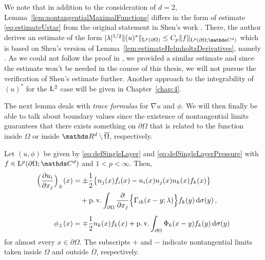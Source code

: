 \begin{rem}
  We note that in addition to the consideration of $d = 2$, Lemma~\ref{lem:nontangentialMaximalFunctions} differs in the form of estimate \eqref{eq:estimateUstar} from the original statement in Shen's work \cite[Lem.\@~3.2]{Shen2012}.
  There, the author derives an estimate of the form $|\lambda|^{1/2}\|(u)^*\|_{\Ell^p(\partial\Omega)} \leq C_p \|f\|_{\Ell^p(\partial\Omega; \C^d)}$ which is based on Shen's version of Lemma~\ref{lem:estimateHelmholtzDerivatives}, namely \cite[Lem.\@~2.1]{Shen2012}.
  As we could not follow the proof in \cite{Shen2012}, we provided a similar estimate and since the estimate won't be needed in the course of this thesis, we will not pursue the verification of Shen's estimate further.
  Another approach to the integrability of $(u)^*$ for the $\mathrm{L}^2$ case will be given in Chapter~\ref{chap:4}.
\end{rem}

The next lemma deals with \emph{trace formulas} for $\nabla u$ and $\phi$. 
We will then finally be able to talk about boundary values since the existence of nontangential limits guarantees that there exists something on $\partial\Omega$ that is related to the function inside $\Omega$ or inside $\R^d \setminus \overline\Omega$, respectively.

\begin{lem}
  \label{lem:traceFormulas}
  Let $(u,\phi)$ be given by \eqref{eq:defSingleLayer} and \eqref{eq:defSingleLayerPressure} with $f \in \Ell^p(\partial\Omega; \C^d)$ and $1 < p < \infty$.
  Then,
  \begin{align}
    \Big( \frac{\partial u_i}{\partial x_j} \Big)_{\pm}(x) 
    &= \pm \frac{1}{2} \big\{ n_j(x) f_i(x) - n_i(x) n_j(x) n_k(x) f_k(x) \big\} \nonumber\\
    &\quad+ \operatorname{p. v.} \int_{\partial\Omega} \frac{\partial}{\partial x_j} \Big\{ \Gamma_{ik} (x - y; \lambda) \Big\} f_k(y) \, {\operatorname{d}\!{\sigma}}(y)\,, \label{eq:traceFormula} \\[0.5em]
    \phi_\pm(x) &= \mp \frac{1}{2} n_k(x) f_k(x) + \operatorname{p. v.}\int_{\partial\Omega} \Phi_k(x - y) f_k(y) \, {\operatorname{d}\!{\sigma}}(y) \nonumber
  \end{align}
  for almost every $x \in \partial\Omega$.
  The subscripts $+$ and $-$ indicate nontangential limits taken inside $\Omega$ and outside $\overline\Omega$, respectively.
\end{lem}

